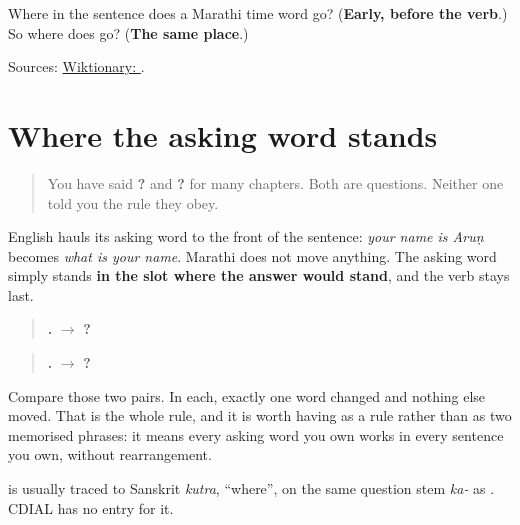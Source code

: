 \begin{tcolorbox}[breakable,colback=teal!4,colframe=teal!35!black,title={Before you move on}]
Where in the sentence does a Marathi time word go? (\textbf{Early, before the verb}.) So where does \textbf{} go? (\textbf{The same place}.)

Sources: \href{https://en.wiktionary.org/wiki/\%E0\%A4\%95\%E0\%A4\%A7\%E0\%A5\%80}{Wiktionary: }.
\end{tcolorbox}
\section[\texorpdfstring{… \mr{कुठे} …? (… kuṭhe …?)}{… कुठे …? (… kuṭhe …?)}]{Where the asking word stands}

\label{lesson:MR-C38-wh-order}



\begin{quote}
You have said \textbf{   ?} and \textbf{  ?} for many chapters. Both are questions. Neither one told you the rule they obey.
\end{quote}

\begin{grammarlens}[title={Grammar Lens: nothing moves to the front}]
English hauls its asking word to the front of the sentence: \emph{your name is Aruṇ} becomes \emph{what is your name}. Marathi does not move anything. The asking word simply stands \textbf{in the slot where the answer would stand}, and the verb stays last.

\begin{quote}
\textbf{   .} $\to$ \textbf{   ?}
\end{quote}

\begin{quote}
\textbf{  .} $\to$ \textbf{  ?}
\end{quote}

Compare those two pairs. In each, exactly one word changed and nothing else moved. That is the whole rule, and it is worth having as a rule rather than as two memorised phrases: it means every asking word you own works in every sentence you own, without rearrangement.
\end{grammarlens}

\begin{cousinweb}
\textbf{} is usually traced to Sanskrit \emph{kutra}, \textquotedblleft{}where\textquotedblright{}, on the same question stem \emph{ka-} as \textbf{}. CDIAL has no entry for it.
\end{cousinweb}

